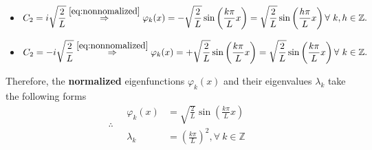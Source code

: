 \documentclass[12pt]{article}
\begin{document}
\begin{enumerate}
\begin{itemize}
		      \item $\displaystyle C_{2} = i\sqrt{\frac{2}{L}}
			            \stackrel{\eqref{eq:nonnomalized}}{\Rightarrow}
			            \varphi_k(x)
			            = - \sqrt{\frac{2}{L}}\sin\left(\frac{k \pi}{L} x\right)
			            = \sqrt{\frac{2}{L}}\sin\left(\frac{h \pi}{L} x\right)
			            \forall\ k,h\in\mathbb{Z}.
		            $
		      \item $\displaystyle C_{2} = - i\sqrt{\frac{2}{L}}
			            \stackrel{\eqref{eq:nonnomalized}}{\Rightarrow}
			            \varphi_k(x)
			            = + \sqrt{\frac{2}{L}}\sin\left(\frac{k \pi}{L} x\right)
			            = \sqrt{\frac{2}{L}}\sin\left(\frac{k \pi}{L} x\right)
			            \forall\ k\in\mathbb{Z}.
		            $
	      \end{itemize}
	      
	      Therefore, the \textbf{normalized} eigenfunctions $\varphi_k(x)$ and their eigenvalues $\lambda_k$
	      take the following forms
	      \begin{equation*}
		      \therefore\quad
		      \boxed{
			      \begin{aligned}
				      \varphi_k(x) & = \sqrt{\frac{2}{L}} \sin\left(\frac{k \pi}{L} x\right) \\
				      \lambda_k    & = \left( \frac{k \pi}{L} \right)^2, 
				      \forall\ k\in\mathbb{Z}
			      \end{aligned}
		      }
	      \end{equation*}
	      

\end{enumerate}
\end{document}
